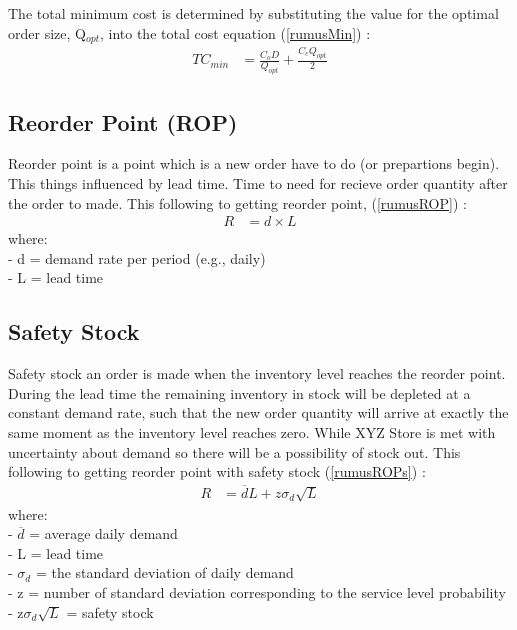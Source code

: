\documentclass[12pt,a4paper,final]{iopart}
\begin{document}
The total minimum cost is determined by substituting the value for the optimal order size, Q$_{opt}$, into the total cost equation (\ref{rumusMin}) :
\begin{eqnarray}
	\label{rumusMin}
	TC_{min} &= \frac{C_oD}{Q_{opt}} + \frac{C_cQ_{opt}}{2}
\end{eqnarray}

\subsection{Reorder Point (ROP)}
Reorder point is a point which is a new order have to do (or prepartions begin). This things influenced by lead time. Time to need for recieve order quantity after the order to made. This following to getting reorder point, (\ref{rumusROP}) \cite{Rusell2011}:
\begin{eqnarray}
	\label{rumusROP}
	R &= d \times L
\end{eqnarray}
where:\\
- d = demand rate per period (e.g., daily)\\
- L = lead time

\subsection{Safety Stock}
Safety stock an order is made when the inventory level reaches the reorder point. During the lead time the remaining inventory in stock will be depleted at a constant demand rate, such that the new order quantity will arrive at exactly the same moment as the inventory level reaches zero. While XYZ Store is met with uncertainty about demand so there will be a possibility of stock out. This following to getting reorder point with safety stock (\ref{rumusROPs}) \cite{Rusell2011}:
\begin{eqnarray}
	\label{rumusROPs}
	R &= \overline{d}L + z\sigma_d\sqrt{L}
\end{eqnarray}
where:\\
- $\overline{d}$ = average daily demand\\
- L = lead time\\
- $\sigma_d$ = the standard deviation of daily demand\\
- z = number of standard deviation corresponding to the service level probability\\
- z$\sigma_d\sqrt{L}$ = safety stock
\end{document}
